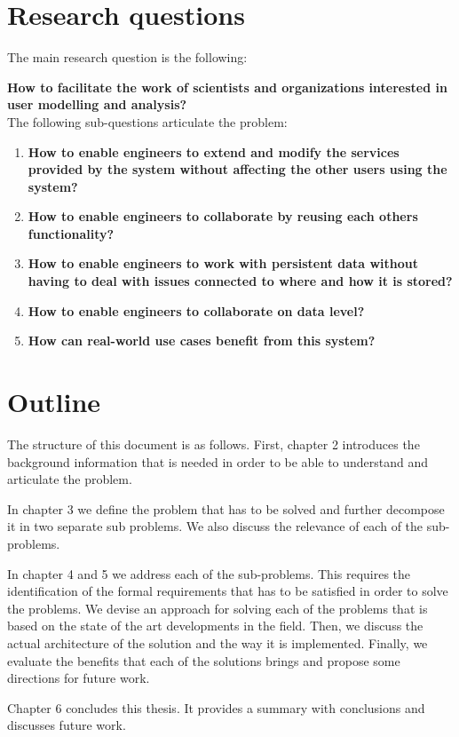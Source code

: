 \section{Research questions}

The main research question is the following:

\textbf{How to facilitate the work of scientists and organizations interested in user modelling and analysis?}\\

The following sub-questions articulate the problem:

\begin{enumerate}
\item \textbf{How to enable engineers to extend and modify the services provided by the system without affecting the other users using the system?}

\item \textbf{How to enable engineers to collaborate by reusing each others functionality?}

\item \textbf{How to enable engineers to work with persistent data without having to deal with issues connected to where and how it is stored?}

\item \textbf{How to enable engineers to collaborate on data level?}

\item \textbf{How can real-world use cases benefit from this system?}

\end{enumerate}


\section{Outline}
The structure of this document is as follows. First, chapter 2 introduces the background information that is needed in order to be able to understand and articulate the problem.

In chapter 3 we define the problem that has to be solved and further decompose it in two separate sub problems. We also discuss the relevance of each of the sub-problems.

In chapter 4 and 5 we address each of the sub-problems. This requires the identification of the formal requirements that has to be satisfied in order to solve the problems. We devise an approach for solving each of the problems that is based on the state of the art developments in the field. Then, we discuss the actual architecture of the solution and the way it is implemented. Finally, we evaluate the benefits that each of the solutions brings and propose some directions for future work. 

Chapter 6 concludes this thesis. It provides a summary with conclusions and discusses future work.